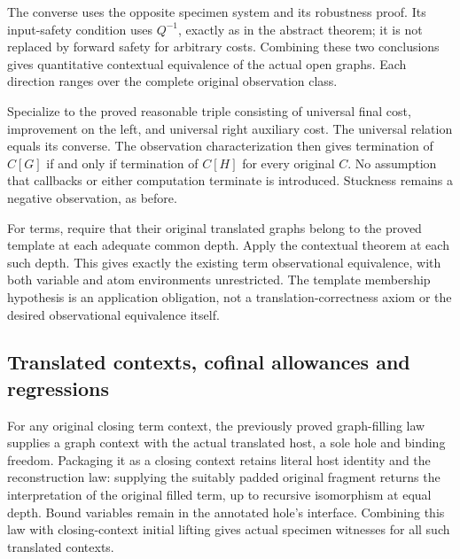 
The converse uses the opposite specimen system and its robustness proof.
Its input-safety condition uses $Q^{-1}$, exactly as in the abstract theorem;
it is not replaced by forward safety for arbitrary costs. Combining these
two conclusions gives quantitative contextual equivalence of the actual open
graphs. Each direction ranges over the complete original observation class.


Specialize to the proved reasonable triple consisting of universal final
cost, improvement on the left, and universal right auxiliary cost. The
universal relation equals its converse. The observation characterization then
gives termination of $C[G]$ if and only if termination of $C[H]$ for every
original $C$. No assumption that callbacks or either computation terminate is
introduced. Stuckness remains a negative observation, as before.


For terms, require that their original translated graphs belong to the
proved template at each adequate common depth. Apply the contextual theorem
at each such depth. This gives exactly the existing term observational
equivalence, with both variable and atom environments unrestricted.
The template membership hypothesis is an application obligation, not a
translation-correctness axiom or the desired observational equivalence itself.


\subsection{Translated contexts, cofinal allowances and regressions}
For any original closing term context, the previously proved graph-filling
law supplies a graph context with the actual translated host, a sole hole and
binding freedom. Packaging it as a closing context retains literal host
identity and the reconstruction law: supplying the suitably padded original
fragment returns the interpretation of the original filled term, up to
recursive isomorphism at equal depth. Bound variables remain in the annotated
hole's interface. Combining this law with closing-context initial lifting
gives actual specimen witnesses for all such translated contexts.

